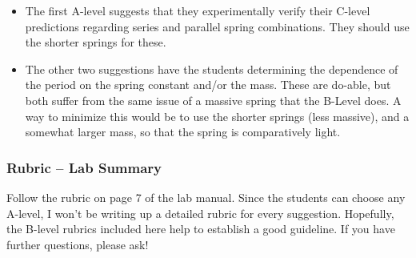 \documentclass[fleqn,letterpaper]{article}
\begin{document}
\begin{itemize}
 \item{The first A-level suggests that they experimentally verify their C-level predictions regarding series and parallel spring combinations.  They should use the shorter springs for these.}
 \item{The other two suggestions have the students determining the dependence of the period on the spring constant and/or the mass.  These are do-able, but both suffer from the same issue of a massive spring that the B-Level does.  A way to minimize this would be to use the shorter springs (less massive), and a somewhat larger mass, so that the spring is comparatively light.}
\end{itemize}

\subsubsection*{Rubric -- Lab Summary}

Follow the rubric on page 7 of the lab manual.  Since the students can choose any A-level, I won't be writing up a detailed rubric for every suggestion.  Hopefully, the B-level rubrics included here help to establish a good guideline.  If you have further questions, please ask!

\label{LastPage}
\end{document}

